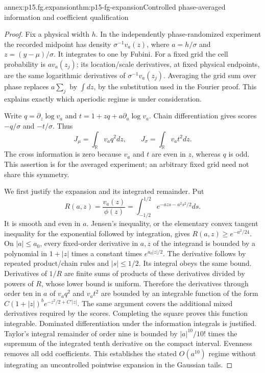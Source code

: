\begin{annexitem}{annex:p15.fg.expansion}{thm:p15-fg-expansion}{Controlled phase-averaged information and coefficient qualification}
\begin{proof}
Fix a physical width \(h\). In the independently phase-randomized
experiment the recorded midpoint has density
\(\sigma^{-1}v_a(z)\), where \(a=h/\sigma\) and
\(z=(y-\mu)/\sigma\). It integrates to one by Fubini.
For a fixed grid the cell probability is \(a v_a(z_j)\);
its location/scale derivatives, at fixed physical endpoints, are the same
logarithmic derivatives of \(\sigma^{-1}v_a(z_j)\). Averaging the
grid sum over phase replaces \(a\sum_j\) by \(\int dz\),
by the substitution used in the Fourier proof. This explains exactly
which aperiodic regime is under consideration.

Write \(q=\partial_z\log v_a\) and
\(t=1+zq+a\partial_a\log v_a\). Chain differentiation gives scores
\(-q/\sigma\) and \(-t/\sigma\). Thus
\[
 J_\mu=\int_{\mathbb R}v_a q^2 dz,
 \qquad J_\sigma=\int_{\mathbb R}v_a t^2 dz.
\]
The cross information is zero because \(v_a\) and \(t\) are even in
\(z\), whereas \(q\) is odd. This assertion is for the averaged
experiment; an arbitrary fixed grid need not share this symmetry.

We first justify the expansion and its integrated remainder. Put
\[
 R(a,z)=\frac{v_a(z)}{\phi(z)}
       =\int_{-1/2}^{1/2}e^{-azs-a^2s^2/2}ds.
\]
It is smooth and even in \(a\). Jensen's inequality, or the elementary
convex tangent inequality for the exponential followed by integration,
gives \(R(a,z)\geq e^{-a^2/24}\). On \(|a|\leq a_0\), every
fixed-order derivative in \(a,z\) of the integrand is bounded by
a polynomial in \(1+|z|\) times a constant times
\(e^{a_0|z|/2}\). The derivative follows by repeated product/chain
rules and \(|s|\leq1/2\). Its integral obeys the same bound.
Derivatives of \(1/R\) are finite sums of products of these derivatives
divided by powers of \(R\), whose lower bound is uniform. Therefore
the derivatives through order ten in \(a\) of
\(v_aq^2\) and \(v_at^2\) are bounded by an integrable function
of the form
\(C(1+|z|)^b e^{-z^2/2+C'|z|}\).
The same argument covers the additional mixed derivatives required by
the scores. Completing the square proves this function integrable.
Dominated differentiation under the information integrals is justified.
Taylor's integral remainder of order nine is bounded by
\(|a|^{10}/10!\) times the supremum of the integrated tenth derivative
on the compact interval. Evenness removes all odd coefficients. This
establishes the stated \(O(a^{10})\) regime without integrating an
uncontrolled pointwise expansion in the Gaussian tails.


\end{proof}
\end{annexitem}
